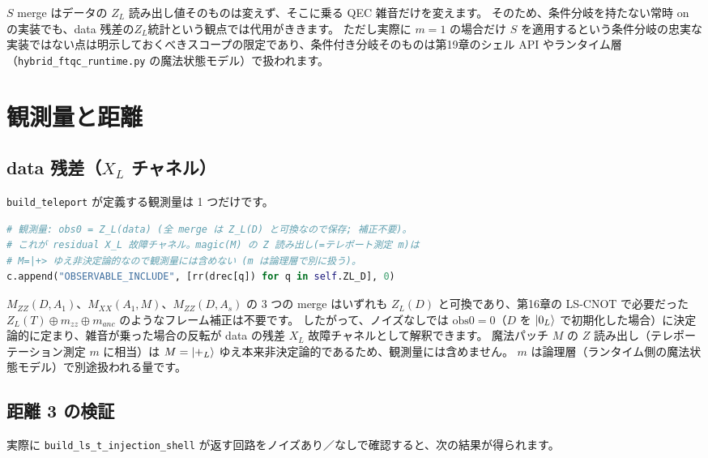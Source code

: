 $S$ merge はデータの $Z_L$ 読み出し値そのものは変えず、そこに乗る QEC 雑音だけを変えます。
そのため、条件分岐を持たない常時 on の実装でも、data 残差の$Z_L$統計という観点では代用がききます。
ただし実際に $m=1$ の場合だけ $S$ を適用するという条件分岐の忠実な実装ではない点は明示しておくべきスコープの限定であり、条件付き分岐そのものは第19章のシェル API やランタイム層（\texttt{hybrid\_ftqc\_runtime.py} の魔法状態モデル）で扱われます。

\section{観測量と距離}\label{sec:orthogonal_obs}

\subsection{data 残差（\texorpdfstring{$X_L$}{X\_L} チャネル）}

\texttt{build\_teleport} が定義する観測量は 1 つだけです。

\begin{lstlisting}[language=Python, caption={観測量は data の Z\_L のみ（\codepath{src/stages/02_circuit_level/src/ftqc/ls_cnot_ft.py}）}]
# 観測量: obs0 = Z_L(data) (全 merge は Z_L(D) と可換なので保存; 補正不要)。
# これが residual X_L 故障チャネル。magic(M) の Z 読み出し(=テレポート測定 m)は
# M=|+> ゆえ非決定論的なので観測量には含めない (m は論理層で別に扱う)。
c.append("OBSERVABLE_INCLUDE", [rr(drec[q]) for q in self.ZL_D], 0)
\end{lstlisting}

$M_{ZZ}(D,A_1)$、$M_{XX}(A_1,M)$、$M_{ZZ}(D,A_s)$ の 3 つの merge はいずれも $Z_L(D)$ と可換であり、第16章の LS-CNOT で必要だった $Z_L(T)\oplus m_{zz}\oplus m_{anc}$ のようなフレーム補正は不要です。
したがって、ノイズなしでは $\text{obs}0=0$（$D$ を $\ket{0_L}$ で初期化した場合）に決定論的に定まり、雑音が乗った場合の反転が data の残差 $X_L$ 故障チャネルとして解釈できます。
魔法パッチ $M$ の $Z$ 読み出し（テレポーテーション測定 $m$ に相当）は $M=\ket{+_L}$ ゆえ本来非決定論的であるため、観測量には含めません。
$m$ は論理層（ランタイム側の魔法状態モデル）で別途扱われる量です。

\subsection{距離 3 の検証}

実際に \texttt{build\_ls\_t\_injection\_shell} が返す回路をノイズあり／なしで確認すると、次の結果が得られます。

